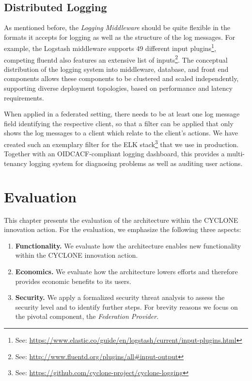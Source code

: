\documentclass{llncs}
\begin{document}
\subsection{Distributed Logging}

As mentioned before, the \textit{Logging Middleware} should be quite flexible in the formats it accepts for logging as well as the structure of the log messages. For example, the Logstash middleware supports 49 different input plugins\footnote{See: \url{https://www.elastic.co/guide/en/logstash/current/input-plugins.html}}, competing fluentd also features an extensive list of inputs\footnote{See: \url{http://www.fluentd.org/plugins/all\#input-output}}. The conceptual distribution of the logging system into middleware, database, and front end components allows these components to be clustered and scaled independently, supporting diverse deployment topologies, based on performance and latency requirements.

When applied in a federated setting, there needs to be at least one log message field identifying the respective client, so that a filter can be applied that only shows the log messages to a client which relate to the client's actions. We have created such an exemplary filter for the ELK stack\footnote{See: \url{https://github.com/cyclone-project/cyclone-logging}} that we use in production. Together with an OIDCACF-compliant logging dashboard, this provides a multi-tenancy logging system for diagnosing problems as well as auditing user actions.

\section{Evaluation}
\label{sec:evaluation}

This chapter presents the evaluation of the architecture within the CYCLONE innovation action. For the evaluation, we emphasize the following three aspects:

\begin{enumerate}
	\item \textbf{Functionality.} We evaluate how the architecture enables new functionality within the CYCLONE innovation action.
	
	\item \textbf{Economics.} We evaluate how the architecture lowers efforts and therefore provides economic benefits to its users.
	
	\item \textbf{Security.} We apply a formalized security threat analysis to assess the security level and to identify further steps. For brevity reasons we focus on the pivotal component, the \textit{Federation Provider}.
\end{enumerate}
\end{document}
